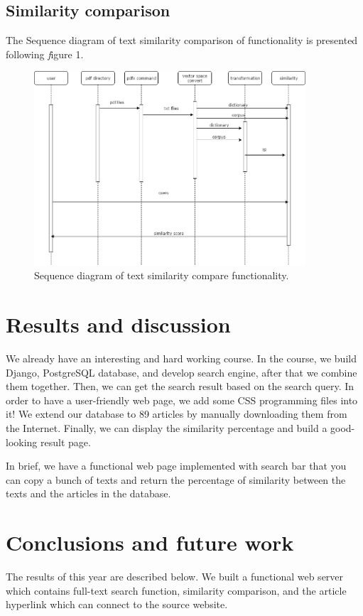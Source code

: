 \documentclass[a4paper,twocolumn,twoside]{article}
\begin{document}
	\subsection{Similarity comparison}
The Sequence diagram of text  similarity  comparison of functionality is presented  following  \textit figure 1. 
	\begin{figure}[htb]
		\begin{center}
			\includegraphics[width=0.9\textwidth]{Rainy_Sequence_diagram}
		\end{center}
		\caption{Sequence diagram of text similarity compare functionality.\label{Sequence diagram}}
	\end{figure}
\newpage

	\section{Results and discussion}
We already have an interesting and hard working course. In the course, we build Django, PostgreSQL database, and develop search engine, after that we combine them together. Then, we can get the search result based on the search query. In order to have a user-friendly web page, we add some CSS programming files into it! We extend our database to 89 articles by manually downloading them from the Internet. Finally, we can display the similarity percentage and build a good-looking result page.

In brief, we have a functional web page implemented with search bar that you can copy a bunch of texts and return the percentage of similarity between the texts and the articles in the database.

	\section{Conclusions and future work}
    The results of this year are described below. We built a functional web server which contains full-text search function, similarity comparison, and the article hyperlink which can connect to the source website.
		
	
	\clearpage 
\end{document}
